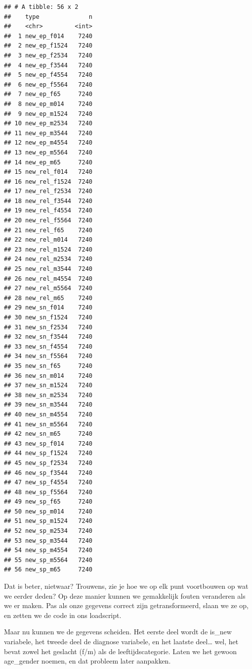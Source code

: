 \documentclass[]{tufte-book}
\newenvironment{Shaded}{}{}
\newcommand{\DataTypeTok}[1]{\textcolor[rgb]{0.56,0.13,0.00}{#1}}
\newcommand{\KeywordTok}[1]{\textcolor[rgb]{0.00,0.44,0.13}{\textbf{#1}}}
\newcommand{\NormalTok}[1]{#1}
\newcommand{\OperatorTok}[1]{\textcolor[rgb]{0.40,0.40,0.40}{#1}}
\newcommand{\StringTok}[1]{\textcolor[rgb]{0.25,0.44,0.63}{#1}}
\begin{document}
\begin{verbatim}
## # A tibble: 56 x 2
##    type              n
##    <chr>         <int>
##  1 new_ep_f014    7240
##  2 new_ep_f1524   7240
##  3 new_ep_f2534   7240
##  4 new_ep_f3544   7240
##  5 new_ep_f4554   7240
##  6 new_ep_f5564   7240
##  7 new_ep_f65     7240
##  8 new_ep_m014    7240
##  9 new_ep_m1524   7240
## 10 new_ep_m2534   7240
## 11 new_ep_m3544   7240
## 12 new_ep_m4554   7240
## 13 new_ep_m5564   7240
## 14 new_ep_m65     7240
## 15 new_rel_f014   7240
## 16 new_rel_f1524  7240
## 17 new_rel_f2534  7240
## 18 new_rel_f3544  7240
## 19 new_rel_f4554  7240
## 20 new_rel_f5564  7240
## 21 new_rel_f65    7240
## 22 new_rel_m014   7240
## 23 new_rel_m1524  7240
## 24 new_rel_m2534  7240
## 25 new_rel_m3544  7240
## 26 new_rel_m4554  7240
## 27 new_rel_m5564  7240
## 28 new_rel_m65    7240
## 29 new_sn_f014    7240
## 30 new_sn_f1524   7240
## 31 new_sn_f2534   7240
## 32 new_sn_f3544   7240
## 33 new_sn_f4554   7240
## 34 new_sn_f5564   7240
## 35 new_sn_f65     7240
## 36 new_sn_m014    7240
## 37 new_sn_m1524   7240
## 38 new_sn_m2534   7240
## 39 new_sn_m3544   7240
## 40 new_sn_m4554   7240
## 41 new_sn_m5564   7240
## 42 new_sn_m65     7240
## 43 new_sp_f014    7240
## 44 new_sp_f1524   7240
## 45 new_sp_f2534   7240
## 46 new_sp_f3544   7240
## 47 new_sp_f4554   7240
## 48 new_sp_f5564   7240
## 49 new_sp_f65     7240
## 50 new_sp_m014    7240
## 51 new_sp_m1524   7240
## 52 new_sp_m2534   7240
## 53 new_sp_m3544   7240
## 54 new_sp_m4554   7240
## 55 new_sp_m5564   7240
## 56 new_sp_m65     7240
\end{verbatim}

Dat is beter, nietwaar? Trouwens, zie je hoe we op elk punt voortbouwen op wat we eerder deden? Op deze manier kunnen we gemakkelijk fouten veranderen als we er maken. Pas als onze gegevens correct zijn getransformeerd, slaan we ze op, en zetten we de code in ons loadscript.

Maar nu kunnen we de gegevens scheiden. Het eerste deel wordt de is\_new variabele, het tweede deel de diagnose variabele, en het laatste deel\ldots{} wel, het bevat zowel het geslacht (f/m) als de leeftijdscategorie. Laten we het gewoon age\_gender noemen, en dat probleem later aanpakken.

\begin{Shaded}
\end{Shaded}
\end{document}
